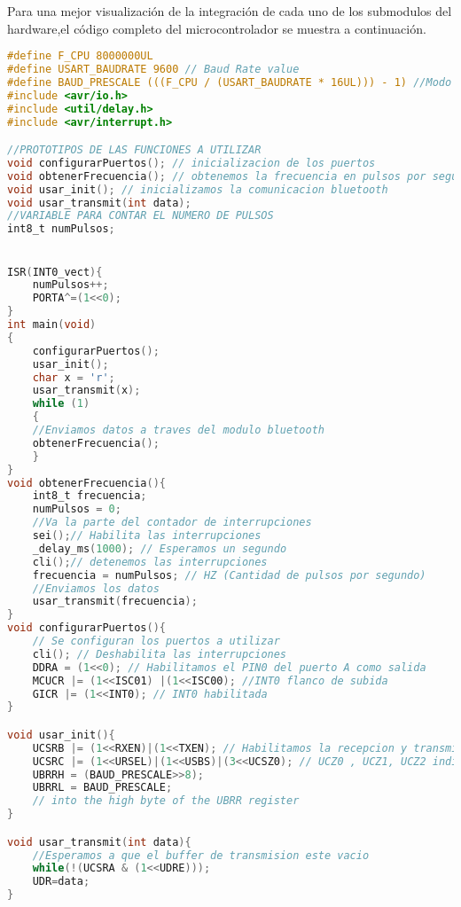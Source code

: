 Para una mejor visualización de la integración de cada uno de los submodulos del hardware,el código completo del microcontrolador se muestra a continuación.
\begin{lstlisting}[language=C]
#define F_CPU 8000000UL
#define USART_BAUDRATE 9600 // Baud Rate value
#define BAUD_PRESCALE (((F_CPU / (USART_BAUDRATE * 16UL))) - 1) //Modo asyncrono normal UBRR
#include <avr/io.h>
#include <util/delay.h>
#include <avr/interrupt.h>

//PROTOTIPOS DE LAS FUNCIONES A UTILIZAR
void configurarPuertos(); // inicializacion de los puertos
void obtenerFrecuencia(); // obtenemos la frecuencia en pulsos por segundo
void usar_init(); // inicializamos la comunicacion bluetooth
void usar_transmit(int data);
//VARIABLE PARA CONTAR EL NUMERO DE PULSOS
int8_t numPulsos;


ISR(INT0_vect){
	numPulsos++;
	PORTA^=(1<<0);
}
int main(void)
{
	configurarPuertos();
	usar_init();
	char x = 'r';
	usar_transmit(x);
	while (1) 
	{
	//Enviamos datos a traves del modulo bluetooth
	obtenerFrecuencia();    
	}
}
void obtenerFrecuencia(){
	int8_t frecuencia;
	numPulsos = 0;
	//Va la parte del contador de interrupciones
	sei();// Habilita las interrupciones
	_delay_ms(1000); // Esperamos un segundo
	cli();// detenemos las interrupciones
	frecuencia = numPulsos; // HZ (Cantidad de pulsos por segundo)
	//Enviamos los datos
	usar_transmit(frecuencia);
}
void configurarPuertos(){
	// Se configuran los puertos a utilizar
	cli(); // Deshabilita las interrupciones
	DDRA = (1<<0); // Habilitamos el PIN0 del puerto A como salida
	MCUCR |= (1<<ISC01) |(1<<ISC00); //INT0 flanco de subida
	GICR |= (1<<INT0); // INT0 habilitada
}

void usar_init(){
	UCSRB |= (1<<RXEN)|(1<<TXEN); // Habilitamos la recepcion y transmision de datos
	UCSRC |= (1<<URSEL)|(1<<USBS)|(3<<UCSZ0); // UCZ0 , UCZ1, UCZ2 indican que se leen 8 bits
	UBRRH = (BAUD_PRESCALE>>8);
	UBRRL = BAUD_PRESCALE;       
	// into the high byte of the UBRR register
}

void usar_transmit(int data){
	//Esperamos a que el buffer de transmision este vacio
	while(!(UCSRA & (1<<UDRE)));
	UDR=data;
}
\end{lstlisting} 